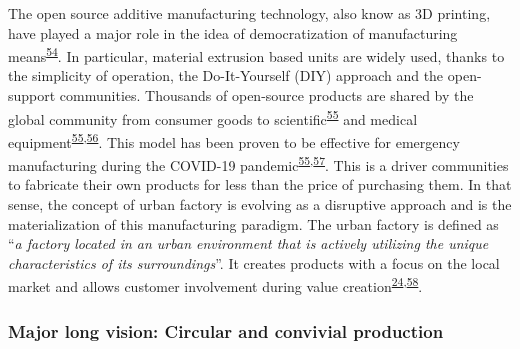 \documentclass[
  11pt,
  a4paperpaper,
  onecolumn]{article}
\begin{document}
The open source additive manufacturing technology, also know as 3D
printing, have played a major role in the idea of democratization of
manufacturing
means\textsuperscript{\protect\hyperlink{ref-Beltagui2020}{54}}. In
particular, material extrusion based units are widely used, thanks to
the simplicity of operation, the Do-It-Yourself (DIY) approach and the
open-support communities. Thousands of open-source products are shared
by the global community from consumer goods to
scientific\textsuperscript{\protect\hyperlink{ref-Pearce2020a}{55}} and
medical
equipment\textsuperscript{\protect\hyperlink{ref-Pearce2020a}{55},\protect\hyperlink{ref-He2014}{56}}.
This model has been proven to be effective for emergency manufacturing
during the COVID-19
pandemic\textsuperscript{\protect\hyperlink{ref-Pearce2020a}{55},\protect\hyperlink{ref-tan2021}{57}}.
This is a driver communities to fabricate their own products for less
than the price of purchasing them. In that sense, the concept of urban
factory is evolving as a disruptive approach and is the materialization
of this manufacturing paradigm. The urban factory is defined as
``\emph{a factory located in an urban environment that is actively
utilizing the unique characteristics of its surroundings}''. It creates
products with a focus on the local market and allows customer
involvement during value
creation\textsuperscript{\protect\hyperlink{ref-Herrmann2020}{24},\protect\hyperlink{ref-Ijassi2022}{58}}.

\hypertarget{major-long-vision-circular-and-convivial-production}{%
\subsubsection{Major long vision: Circular and convivial
production}\label{major-long-vision-circular-and-convivial-production}}
\end{document}
